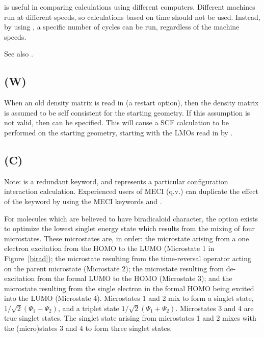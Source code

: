  is useful in comparing calculations using different computers.
Different machines run at different speeds, so calculations based on time
should not be used.  Instead, by using , a specific number of
cycles can be run, regardless of the machine speeds.

See also .

\subsection*{ (W)}
When an old density matrix is read in (a restart option), then the density
matrix is assumed to be self consistent for the starting geometry.  If this
assumption is not valid, then  can be specified.  This will cause
a SCF calculation to be performed on the starting geometry, starting with the
LMOs read in by .

\subsection*{ (C)}
Note:  is a redundant keyword, and represents a particular
configuration  interaction calculation.  Experienced users of MECI (q.v.) can
duplicate the effect of the  keyword    by  using  the  MECI
keywords  and .

For molecules which are believed to have biradicaloid character, the option
exists  to optimize the lowest singlet energy state which results from the
mixing of four microstates.  These microstates are,  in  order:   the
microstate  arising from a one electron excitation from the HOMO to the LUMO
(Microstate 1 in Figure~\ref{birad});  the  microstate  resulting    from  the
 time-reversal  operator acting on the parent microstate
(Microstate 2);  the microstate resulting from de-excitation from the formal
LUMO  to  the  HOMO (Microstate 3);  and the microstate  resulting from the
single electron in the formal HOMO being excited into the LUMO   (Microstate
4).  Microstates 1 and 2 mix to form a singlet state, $1/\sqrt{2}(\Psi_1 -
\Psi_2)$, and a triplet state $1/\sqrt{2}(\Psi_1 + \Psi_2)$. Microstates 3 and
4 are true singlet states.  The singlet state arising from microstates 1 and 2
mixes with the (micro)states 3 and 4 to form three singlet states.

